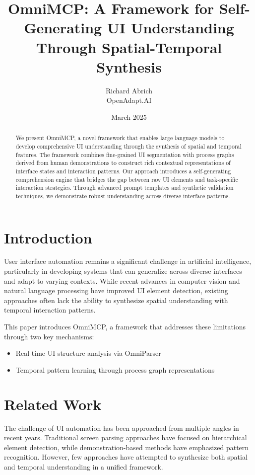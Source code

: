 \documentclass{article}
\title{OmniMCP: A Framework for Self-Generating UI Understanding Through Spatial-Temporal Synthesis}
\author{Richard Abrich \\ OpenAdapt.AI}
\date{March 2025}
\begin{document}
\maketitle

\begin{abstract}
We present OmniMCP, a novel framework that enables large language models to develop comprehensive UI understanding through the synthesis of spatial and temporal features. The framework combines fine-grained UI segmentation with process graphs derived from human demonstrations to construct rich contextual representations of interface states and interaction patterns. Our approach introduces a self-generating comprehension engine that bridges the gap between raw UI elements and task-specific interaction strategies. Through advanced prompt templates and synthetic validation techniques, we demonstrate robust understanding across diverse interface patterns.


\end{abstract}

\section{Introduction}
User interface automation remains a significant challenge in artificial intelligence, particularly in developing systems that can generalize across diverse interfaces and adapt to varying contexts. While recent advances in computer vision and natural language processing have improved UI element detection, existing approaches often lack the ability to synthesize spatial understanding with temporal interaction patterns.

This paper introduces OmniMCP, a framework that addresses these limitations through two key mechanisms:
\begin{itemize}
    \item Real-time UI structure analysis via OmniParser
    \item Temporal pattern learning through process graph representations
\end{itemize}

\section{Related Work}
The challenge of UI automation has been approached from multiple angles in recent years. Traditional screen parsing approaches have focused on hierarchical element detection, while demonstration-based methods have emphasized pattern recognition. However, few approaches have attempted to synthesize both spatial and temporal understanding in a unified framework.
\end{document}
